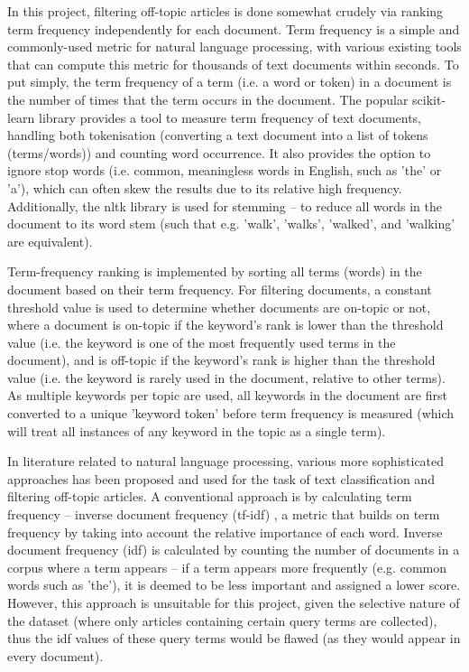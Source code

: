 \documentclass{report}
\begin{document}
In this project, filtering off-topic articles is done somewhat crudely via ranking term frequency independently for each document.
Term frequency is a simple and commonly-used metric for natural language processing, with various existing tools that can compute this metric for thousands of text documents within seconds.
To put simply, the term frequency of a term (i.e. a word or token) in a document is the number of times that the term occurs in the document.
The popular scikit-learn library \cite{Scikit-learn} provides a tool to measure term frequency of text documents, handling both tokenisation (converting a text document into a list of tokens (terms/words)) and counting word occurrence.
It also provides the option to ignore stop words (i.e. common, meaningless words in English, such as 'the' or 'a'), which can often skew the results due to its relative high frequency.
Additionally, the nltk library \cite{Nltk} is used for stemming -- to reduce all words in the document to its word stem (such that e.g. 'walk', 'walks', 'walked', and 'walking' are equivalent).

Term-frequency ranking is implemented by sorting all terms (words) in the document based on their term frequency.
For filtering documents, a constant threshold value is used to determine whether documents are on-topic or not, where a document is on-topic if the keyword's rank is lower than the threshold value (i.e. the keyword is one of the most frequently used terms in the document), and is off-topic if the keyword's rank is higher than the threshold value (i.e. the keyword is rarely used in the document, relative to other terms).
As multiple keywords per topic are used, all keywords in the document are first converted to a unique 'keyword token' before term frequency is measured (which will treat all instances of any keyword in the topic as a single term).  %

In literature related to natural language processing, various more sophisticated approaches has been proposed and used for the task of text classification and filtering off-topic articles.
A conventional approach is by calculating term frequency -- inverse document frequency (tf-idf) \cite{robertson2004understanding, sparck1972statistical}, a metric that builds on term frequency by taking into account the relative importance of each word.
Inverse document frequency (idf) is calculated by counting the number of documents in a corpus where a term appears -- if a term appears more frequently (e.g. common words such as 'the'), it is deemed to be less important and assigned a lower score.
However, this approach is unsuitable for this project, given the selective nature of the dataset (where only articles containing certain query terms are collected), thus the idf values of these query terms would be flawed (as they would appear in every document).
\end{document}
